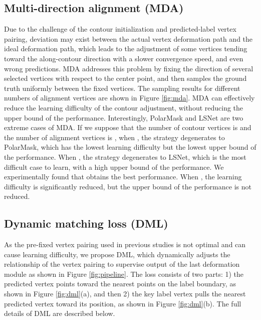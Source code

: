 \documentclass[10pt,twocolumn,letterpaper]{article}
\begin{document}
\subsection{Multi-direction alignment (MDA)}
Due to the challenge of the contour initialization and predicted-label vertex pairing, deviation may exist between the actual vertex deformation path and the ideal deformation path, which leads to the adjustment of some vertices tending toward the along-contour direction with a slower convergence speed, and even wrong predictions. MDA addresses this problem by fixing the direction of several selected vertices with respect to the center point, and then samples the ground truth uniformly between the fixed vertices. The sampling results for different numbers of alignment vertices are shown in Figure \ref{fig:mda}. MDA can effectively reduce the learning difficulty of the contour adjustment, without reducing the upper bound of the performance. Interestingly, PolarMask and LSNet are two extreme cases of MDA. If we suppose that the number of contour vertices is  and the number of alignment vertices is , when , the strategy degenerates to PolarMask, which has the lowest learning difficulty but the lowest upper bound of the performance. When , the strategy degenerates to LSNet, which is the most difficult case to learn, with a high upper bound of the performance. We experimentally found that  obtains the best performance. When , the learning difficulty is significantly reduced, but the upper bound of the performance is not reduced.

\subsection{Dynamic matching loss (DML)}
As the pre-fixed vertex pairing used in previous studies is not optimal and can cause learning difficulty, we propose DML, which dynamically adjusts the relationship of the vertex pairing to supervise output of the last deformation module \cite{deepsnake} as shown in Figure \ref{fig:pipeline}. The loss consists of two parts: 1) the predicted vertex points toward the nearest points on the label boundary, as shown in Figure \ref{fig:dml}(a), and then 2) the key label vertex pulls the nearest predicted vertex toward its position, as shown in Figure \ref{fig:dml}(b). The full details of DML are described below.
\end{document}
